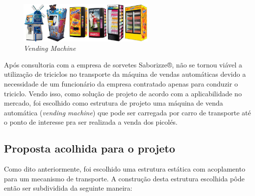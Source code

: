 \begin{figure}[H]
	\centering
    \includegraphics[width=0.6\textwidth]{figuras/machinewrapsheader}
    \caption{\textit{Vending Machine}}
    \label{fig:machinewrapsheader}
\end{figure}

Após consultoria com a empresa de sorvetes Saborizze®, não se tornou viável a utilização de triciclos no transporte da máquina de vendas automáticas devido a necessidade de um funcionário da empresa contratado apenas para conduzir o triciclo. Vendo isso, como solução de projeto de acordo com a aplicabilidade no mercado, foi escolhido como estrutura de projeto uma máquina de venda automática (\textit{vending machine}) que pode ser carregada por carro de transporte até o ponto de interesse pra ser realizada a venda dos picolés.


\subsection{Proposta acolhida para o projeto}

Como dito anteriormente, foi escolhido uma estrutura estática com acoplamento para um mecanismo de transporte. A construção desta estrutura escolhida pôde então ser subdividida da seguinte maneira:
 
